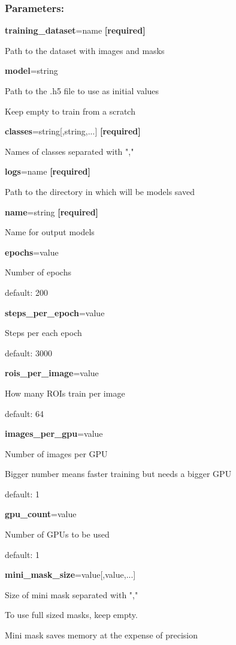 \subsubsection*{Parameters:}

\begin{flushleft}
\textbf{training\_dataset}=name \textbf{[required]}

\tab Path to the dataset with images and masks

\textbf{model}=string

\tab Path to the .h5 file to use as initial values

\tab Keep empty to train from a scratch

\textbf{classes}=string[,string,...] \textbf{[required]}
           
\tab Names of classes separated with ","

\textbf{logs}=name \textbf{[required]}

\tab Path to the directory in which will be models saved

\textbf{name}=string \textbf{[required]}

\tab Name for output models

\textbf{epochs}=value

\tab Number of epochs

\tab default: 200

\textbf{steps\_per\_epoch}=value

\tab Steps per each epoch

\tab default: 3000

\textbf{rois\_per\_image}=value

\tab How many ROIs train per image

\tab default: 64

\textbf{images\_per\_gpu}=value

\tab Number of images per GPU

\tab Bigger number means faster training but needs a bigger GPU

\tab default: 1

\textbf{gpu\_count}=value

\tab Number of GPUs to be used

\tab default: 1

\textbf{mini\_mask\_size}=value[,value,...]

\tab Size of mini mask separated with ","

\tab To use full sized masks, keep empty.

\tab Mini mask saves memory at the expense of precision


\end{flushleft}

